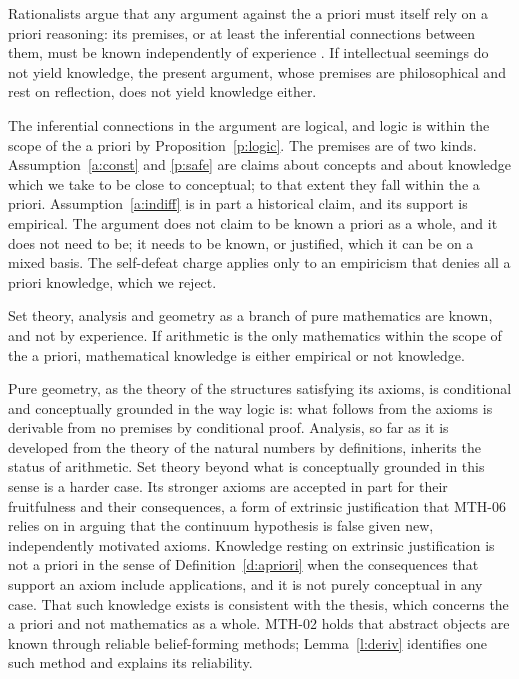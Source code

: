\documentclass{situationist-preprint}
\begin{document}
\begin{objection}
Rationalists argue that any argument against the a priori must itself rely on a priori reasoning: its premises, or at least the inferential connections between them, must be known independently of experience \citep{BonJour1998}. If intellectual seemings do not yield knowledge, the present argument, whose premises are philosophical and rest on reflection, does not yield knowledge either.
\end{objection}

\begin{reply}
The inferential connections in the argument are logical, and logic is within the scope of the a priori by Proposition~\ref{p:logic}. The premises are of two kinds. Assumption~\ref{a:const} and \ref{p:safe} are claims about concepts and about knowledge which we take to be close to conceptual; to that extent they fall within the a priori. Assumption~\ref{a:indiff} is in part a historical claim, and its support is empirical. The argument does not claim to be known a priori as a whole, and it does not need to be; it needs to be known, or justified, which it can be on a mixed basis. The self-defeat charge applies only to an empiricism that denies all a priori knowledge, which we reject.
\end{reply}

\begin{objection}
Set theory, analysis and geometry as a branch of pure mathematics are known, and not by experience. If arithmetic is the only mathematics within the scope of the a priori, mathematical knowledge is either empirical or not knowledge.
\end{objection}

\begin{reply}
Pure geometry, as the theory of the structures satisfying its axioms, is conditional and conceptually grounded in the way logic is: what follows from the axioms is derivable from no premises by conditional proof. Analysis, so far as it is developed from the theory of the natural numbers by definitions, inherits the status of arithmetic. Set theory beyond what is conceptually grounded in this sense is a harder case. Its stronger axioms are accepted in part for their fruitfulness and their consequences, a form of extrinsic justification that MTH-06 relies on in arguing that the continuum hypothesis is false given new, independently motivated axioms. Knowledge resting on extrinsic justification is not a priori in the sense of Definition~\ref{d:apriori} when the consequences that support an axiom include applications, and it is not purely conceptual in any case. That such knowledge exists is consistent with the thesis, which concerns the a priori and not mathematics as a whole. MTH-02 holds that abstract objects are known through reliable belief-forming methods; Lemma~\ref{l:deriv} identifies one such method and explains its reliability.
\end{reply}
\end{document}
